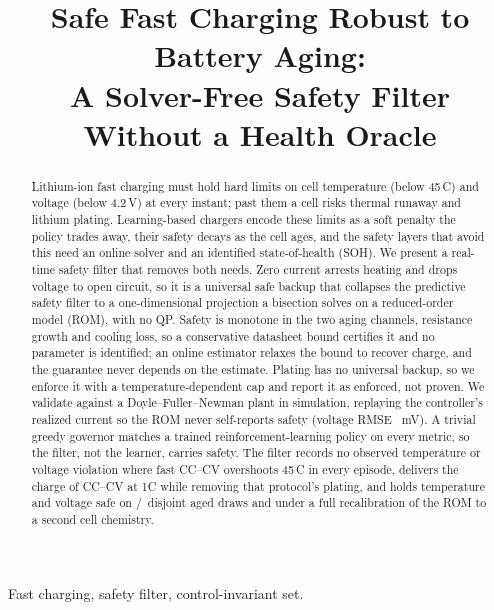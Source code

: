 \documentclass[conference]{IEEEtran}
\newcommand{\SI}[2]{#1\,#2}
\newcommand{\degreeCelsius}{\textdegree C}
\begin{document}
\title{Safe Fast Charging Robust to Battery Aging:\\
A Solver-Free Safety Filter Without a Health Oracle}

\author{
}

\maketitle

\begin{abstract}
Lithium-ion fast charging must hold hard limits on cell temperature (below \SI{45}{\degreeCelsius})
and voltage (below \SI{4.2}{V}) at every instant; past them a cell risks thermal runaway and lithium
plating. Learning-based chargers encode these limits as a soft penalty the policy trades away, their
safety decays as the cell ages, and the safety layers that avoid this need an online solver and an
identified state-of-health (SOH). We present a real-time safety filter that removes both needs. Zero
current arrests heating and drops voltage to open circuit, so it is a universal safe backup that
collapses the predictive safety filter to a one-dimensional projection a bisection solves on a
reduced-order model (ROM), with no QP. Safety is monotone in the two aging channels, resistance growth
and cooling loss, so a conservative datasheet bound certifies it and no parameter is identified; an
online estimator relaxes the bound to recover charge, and the guarantee never depends on the estimate.
Plating has no universal backup, so we enforce it with a temperature-dependent cap and report it as
enforced, not proven. We validate against a Doyle--Fuller--Newman plant in simulation, replaying the
controller's realized current so the ROM never self-reports safety (voltage RMSE \VRMSE~mV). A trivial
greedy governor matches a trained reinforcement-learning policy on every metric, so the filter, not
the learner, carries safety. The filter records no observed temperature or voltage violation where
fast CC--CV overshoots \SI{45}{\degreeCelsius} in every episode, delivers the charge of CC--CV at 1C
while removing that protocol's plating, and holds temperature and voltage safe on \valSafe/\valN\
disjoint aged draws and under a full recalibration of the ROM to a second cell chemistry.
\end{abstract}

\begin{IEEEkeywords}
Fast charging, safety filter, control-invariant set.
\end{IEEEkeywords}
\end{document}
